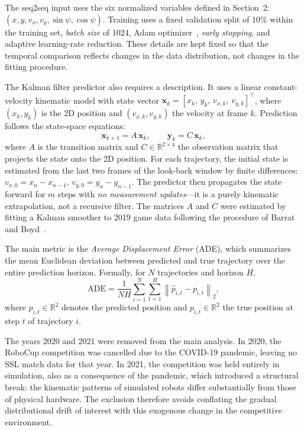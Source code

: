\documentclass[runningheads]{llncs}
\begin{document}
The seq2seq input uses the six normalized variables defined in Section~2: \((x, y, v_x, v_y, \sin\psi, \cos\psi)\). Training uses a fixed validation split of 10\% within the training set, \textit{batch size} of 1024, Adam optimizer~\cite{adam}, \textit{early stopping}, and adaptive learning-rate reduction. These details are kept fixed so that the temporal comparison reflects changes in the data distribution, not changes in the fitting procedure.

The Kalman filter predictor also requires a description. It uses a linear constant-velocity kinematic model with state vector \(\mathbf{x}_k = [x_k,\, y_k,\, v_{x,k},\, v_{y,k}]^\top\), where \((x_k, y_k)\) is the 2D position and \((v_{x,k}, v_{y,k})\) the velocity at frame \(k\). Prediction follows the state-space equations:
\begin{equation}\label{eq:kalman_dyn}
\mathbf{x}_{k+1} = A\,\mathbf{x}_k, \qquad \mathbf{y}_k = C\,\mathbf{x}_k,
\end{equation}
where \(A\) is the transition matrix and \(C \in \mathbb{R}^{2 \times 4}\) the observation matrix that projects the state onto the 2D position. For each trajectory, the initial state is estimated from the last two frames of the look-back window by finite differences: \(v_{x,0} = x_{n} - x_{n-1}\), \(v_{y,0} = y_{n} - y_{n-1}\). The predictor then propagates the state forward for \(m\) steps with \textit{no measurement updates}---it is a purely kinematic extrapolation, not a recursive filter. The matrices \(A\) and \(C\) were estimated by fitting a Kalman smoother to 2019 game data following the procedure of Barrat and Boyd~\cite{barrat}.

The main metric is the \textit{Average Displacement Error} (ADE), which summarizes the mean Euclidean deviation between predicted and true trajectory over the entire prediction horizon. Formally, for \(N\) trajectories and horizon \(H\),
\begin{equation}\label{eq:ade}
\mathrm{ADE} = \frac{1}{NH} \sum_{i=1}^{N}\sum_{t=1}^{H} \left\lVert \hat{p}_{i,t} - p_{i,t} \right\rVert_2,
\end{equation}
where \(\hat{p}_{i,t} \in \mathbb{R}^2\) denotes the predicted position and \(p_{i,t} \in \mathbb{R}^2\) the true position at step \(t\) of trajectory \(i\).

The years 2020 and 2021 were removed from the main analysis. In 2020, the RoboCup competition was cancelled due to the COVID-19 pandemic, leaving no SSL match data for that year. In 2021, the competition was held entirely in simulation, also as a consequence of the pandemic, which introduced a structural break: the kinematic patterns of simulated robots differ substantially from those of physical hardware. The exclusion therefore avoids conflating the gradual distributional drift of interest with this exogenous change in the competitive environment.
\end{document}
